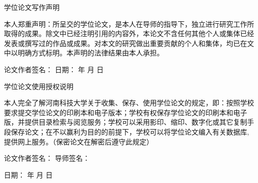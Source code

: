 \thispagestyle{empty}

\begin{center}
{\heiti 学位论文写作声明}
\end{center}

\vspace{1cm}

{\songti
本人郑重声明：所呈交的学位论文，是本人在导师的指导下，独立进行研究工作所取得的成果。除文中已经注明引用的内容外，本论文不含任何其他个人或集体已经发表或撰写过的作品或成果。对本文的研究做出重要贡献的个人和集体，均已在文中以明确方式标明。本声明的法律结果由本人承担。
}

\vspace{2cm}

{\songti
\hspace{6em} 论文作者签名：\hspace{6em} 日期：\hspace{2em} 年 \hspace{2em} 月 \hspace{2em} 日
}

\vspace{3cm}

\begin{center}
{\heiti 学位论文使用授权说明}
\end{center}

\vspace{1cm}

{\songti
本人完全了解河南科技大学关于收集、保存、使用学位论文的规定，即：按照学校要求提交学位论文的印刷本和电子版本；学校有权保存学位论文的印刷本和电子版，并提供目录检索与阅览服务；学校可以采用影印、缩印、数字化或其它复制手段保存论文；在不以赢利为目的的前提下，学校可以将学位论文编入有关数据库,提供网上服务。（保密论文在解密后遵守此规定）
}

\vspace{2cm}

{\songti
\hspace{6em} 论文作者签名：\hspace{6em} 导师签名：

\vspace{1cm}

\hspace{12em} 日期：\hspace{2em} 年 \hspace{2em} 月 \hspace{2em} 日
}

\cleardoublepage
